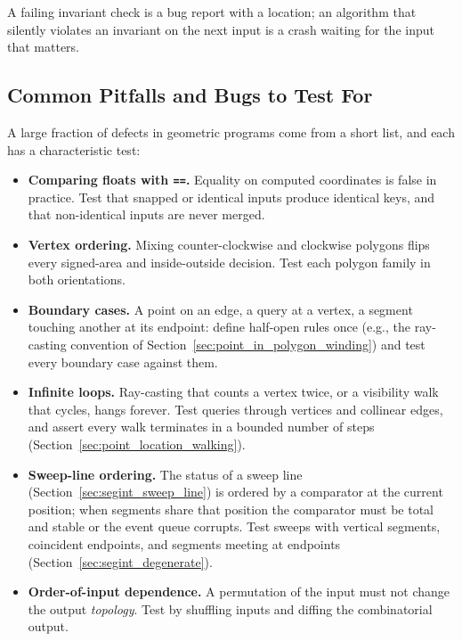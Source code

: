 A failing invariant check is a bug report with a location; an algorithm that
silently violates an invariant on the next input is a crash waiting for the
input that matters.
\subsection{Common Pitfalls and Bugs to Test For}
\label{sec:appimpl_pitfalls}
A large fraction of defects in geometric programs come from a short list,
and each has a characteristic test:

\begin{itemize}
  \item {}\textbf{Comparing floats with
        \texttt{==}.} Equality on computed coordinates is false in practice.
        Test that snapped or identical inputs produce identical keys, and
        that non-identical inputs are never merged.
  \item \textbf{Vertex ordering.} Mixing counter-clockwise and clockwise
        polygons flips every signed-area and inside-outside decision. Test
        each polygon family in both orientations.
  \item \textbf{Boundary cases.} A point on an edge, a query at a vertex, a
        segment touching another at its endpoint: define half-open rules
        once (e.g., the ray-casting convention of
        Section~\ref{sec:point_in_polygon_winding}) and test every boundary
        case against them.
  \item \textbf{Infinite loops.} Ray-casting that counts a vertex twice, or
        a visibility walk that cycles, hangs forever. Test queries through
        vertices and collinear edges, and assert every walk terminates in a
        bounded number of steps (Section~\ref{sec:point_location_walking}).
  \item \textbf{Sweep-line ordering.} The status of a sweep line
        (Section~\ref{sec:segint_sweep_line}) is ordered by a comparator at
        the current position; when segments share that position the
        comparator must be total and stable or the event queue corrupts.
        Test sweeps with vertical segments, coincident endpoints, and
        segments meeting at endpoints (Section~\ref{sec:segint_degenerate}).
  \item \textbf{Order-of-input dependence.} A permutation of the input must
        not change the output \emph{topology}. Test by shuffling inputs and
        diffing the combinatorial output.
\end{itemize}
